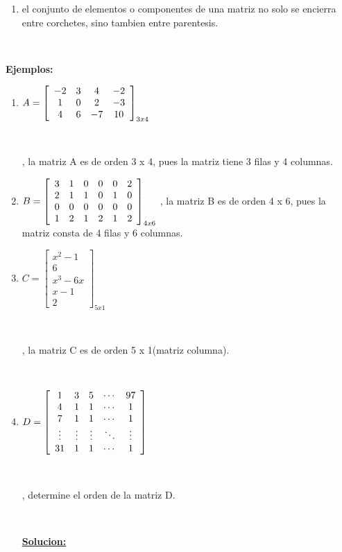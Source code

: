 \documentclass[11pt, conference]{IEEEtran}
\begin{document}
{\begin{enumerate}
\item
el conjunto de elementos o componentes de una matriz no solo se encierra entre corchetes, sino tambien entre parentesis.
\end{enumerate} 

\

{\bf Ejemplos:}
\begin{enumerate} 
\item
$ A=\left[
\begin{array}{c c c c} 
-2&3&4&-2 \\
1&0&2&-3 \\
4&6&-7&10
\end{array} \right]_{3x4} $

\

, la matriz A es de orden 3 x 4, pues la matriz tiene 3 filas y 4 columnas.
\item
$ B=\left[
\begin{array}{c c c c c c} 
3&1&0&0&0&2\\
2&1&1&0&1&0\\
0&0&0&0&0&0\\
1&2&1&2&1&2
\end{array} \right]_{4x6} $ , la matriz B es de orden 4 x 6, pues la matriz consta de 4 filas y 6 columnas.
\item
$ C=\left[
\begin{array}{c} 
{x^2 }-1 \\
6\\
{x^3}-6x \\
x-1\\
2
\end{array} \right]_{5x1} $ 

\

, la matriz C es de orden 5 x 1(matriz columna).

\

\item 
$ D= \left[
\begin{array}{c c c c c} 
1&3&5&\cdots &97\\
4&1&1&\cdots &1\\
7&1&1&\cdots &1\\
\vdots&\vdots&\vdots&\ddots & \vdots \\
31&1&1&\cdots& 1

\end{array} \right]  $ 

\

, determine el orden de la matriz D.

\

{\bf \underline {Solucion:}}


\end{enumerate}}
\end{document}
